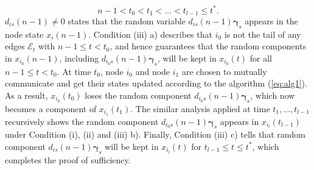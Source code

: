 \documentclass[a4paper, 11pt]{article}
\newcommand{\1}{\mathbf{1}}
\newcommand{\asf}{\mathcal{E}}
\newcommand{\gammab}{{\bm \gamma}}
\newcommand{\tbeg}{n-1 }
\newcommand{\tend}{t^\ast}
\begin{document}
\[
\tbeg<t_0<t_1<\dots<t_{l-1}\le\tend.
\]
$d_{is}(\tbeg)\neq0$ states that the random variable $d_{is}(\tbeg)\gammab_s$ appears in the node state $x_i(\tbeg)$. Condition (iii) a) describes that $i_0$ is not the tail of any edges $\asf_{t}$ with $\tbeg\le t < t_0$, and hence guarantees that the random components in $x_{i_0}(\tbeg)$, including $d_{i_0s}(\tbeg)\gammab_s$, will be kept in $x_{i_0}(t)$ for all $\tbeg\le t < t_0$.
At time $t_0$, node $i_0$ and node $i_1$ are chosen to mutually communicate and get their states updated according to the algorithm (\ref{eq:alg1}).
As a result, $x_{i_0}(t_0)$ loses the random component $d_{i_0s}(\tbeg)\gammab_s$, which now becomes a component of $x_{i_1}(t_1)$. The similar analysis applied at time $t_1,\dots,t_{l-1}$ recursively shows the random component $d_{i_0s}(\tbeg)\gammab_s$ appears in $x_{i_l}(t_{l-1})$ under Condition (i), (ii) and (iii) b).
Finally, Condition (iii) c) tells that random component $d_{is}(\tbeg)\gammab_s$ will be kept in $x_{i_l}(t)$ for $t_{l-1}\le t\le \tend$,
which completes the proof of sufficiency.\\
\end{document}
